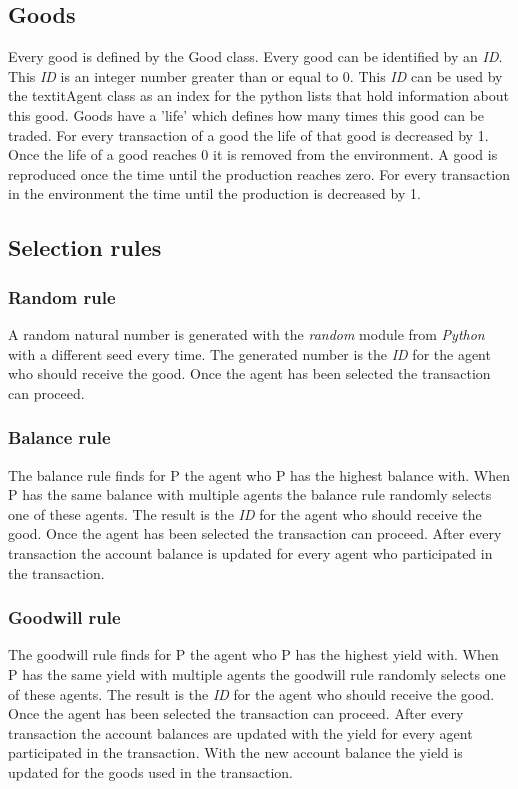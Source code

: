\documentclass[twoside,openright]{uva-bachelor-thesis}
\begin{document}
\subsection{Goods}
Every good is defined by the Good class. Every good can be identified by an \textit{ID}. This \textit{ID} is an integer number greater than or equal to 0. This \textit{ID} can be used by the textit{Agent} class as an index for the python lists that hold information about this good. Goods have a 'life' which defines how many times this good can be traded. For every transaction of a good the life of that good is decreased by 1. Once the life of a good reaches 0 it is removed from the environment. A good is reproduced once the time until the production reaches zero. For every transaction in the environment the time until the production is decreased by 1.

\subsection{Selection rules}

\subsubsection{Random rule}
A random natural number is generated with the \textit{random} module from \textit{Python} with a different seed every time. The generated number is the \textit{ID} for the agent who should receive the good. Once the agent has been selected the transaction can proceed.

\subsubsection{Balance rule}
The balance rule finds for P the agent who P has the highest balance with. When P has the same balance with multiple agents the balance rule randomly selects one of these agents. The result is the \textit{ID} for the agent who should receive the good. Once the agent has been selected the transaction can proceed. After every transaction the account balance is updated for every agent who participated in the transaction.

\subsubsection{Goodwill rule}
The goodwill rule finds for P the agent who P has the highest yield with. When P has the same yield with multiple agents the goodwill rule randomly selects one of these agents. The result is the \textit{ID} for the agent who should receive the good. Once the agent has been selected the transaction can proceed. After every transaction the account balances are updated with the yield for every agent participated in the transaction. With the new account balance the yield is updated for the goods used in the transaction.
\end{document}
